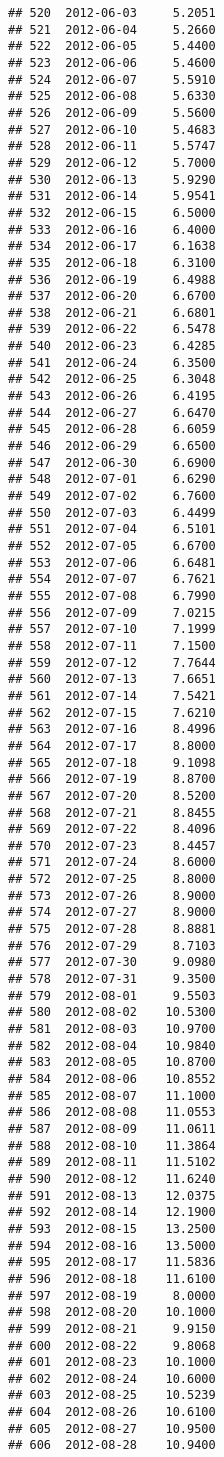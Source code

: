 \documentclass[
]{article}
\begin{document}
\begin{verbatim}
## 520  2012-06-03     5.2051
## 521  2012-06-04     5.2660
## 522  2012-06-05     5.4400
## 523  2012-06-06     5.4600
## 524  2012-06-07     5.5910
## 525  2012-06-08     5.6330
## 526  2012-06-09     5.5600
## 527  2012-06-10     5.4683
## 528  2012-06-11     5.5747
## 529  2012-06-12     5.7000
## 530  2012-06-13     5.9290
## 531  2012-06-14     5.9541
## 532  2012-06-15     6.5000
## 533  2012-06-16     6.4000
## 534  2012-06-17     6.1638
## 535  2012-06-18     6.3100
## 536  2012-06-19     6.4988
## 537  2012-06-20     6.6700
## 538  2012-06-21     6.6801
## 539  2012-06-22     6.5478
## 540  2012-06-23     6.4285
## 541  2012-06-24     6.3500
## 542  2012-06-25     6.3048
## 543  2012-06-26     6.4195
## 544  2012-06-27     6.6470
## 545  2012-06-28     6.6059
## 546  2012-06-29     6.6500
## 547  2012-06-30     6.6900
## 548  2012-07-01     6.6290
## 549  2012-07-02     6.7600
## 550  2012-07-03     6.4499
## 551  2012-07-04     6.5101
## 552  2012-07-05     6.6700
## 553  2012-07-06     6.6481
## 554  2012-07-07     6.7621
## 555  2012-07-08     6.7990
## 556  2012-07-09     7.0215
## 557  2012-07-10     7.1999
## 558  2012-07-11     7.1500
## 559  2012-07-12     7.7644
## 560  2012-07-13     7.6651
## 561  2012-07-14     7.5421
## 562  2012-07-15     7.6210
## 563  2012-07-16     8.4996
## 564  2012-07-17     8.8000
## 565  2012-07-18     9.1098
## 566  2012-07-19     8.8700
## 567  2012-07-20     8.5200
## 568  2012-07-21     8.8455
## 569  2012-07-22     8.4096
## 570  2012-07-23     8.4457
## 571  2012-07-24     8.6000
## 572  2012-07-25     8.8000
## 573  2012-07-26     8.9000
## 574  2012-07-27     8.9000
## 575  2012-07-28     8.8881
## 576  2012-07-29     8.7103
## 577  2012-07-30     9.0980
## 578  2012-07-31     9.3500
## 579  2012-08-01     9.5503
## 580  2012-08-02    10.5300
## 581  2012-08-03    10.9700
## 582  2012-08-04    10.9840
## 583  2012-08-05    10.8700
## 584  2012-08-06    10.8552
## 585  2012-08-07    11.1000
## 586  2012-08-08    11.0553
## 587  2012-08-09    11.0611
## 588  2012-08-10    11.3864
## 589  2012-08-11    11.5102
## 590  2012-08-12    11.6240
## 591  2012-08-13    12.0375
## 592  2012-08-14    12.1900
## 593  2012-08-15    13.2500
## 594  2012-08-16    13.5000
## 595  2012-08-17    11.5836
## 596  2012-08-18    11.6100
## 597  2012-08-19     8.0000
## 598  2012-08-20    10.1000
## 599  2012-08-21     9.9150
## 600  2012-08-22     9.8068
## 601  2012-08-23    10.1000
## 602  2012-08-24    10.6000
## 603  2012-08-25    10.5239
## 604  2012-08-26    10.6100
## 605  2012-08-27    10.9500
## 606  2012-08-28    10.9400

\end{verbatim}
\end{document}
